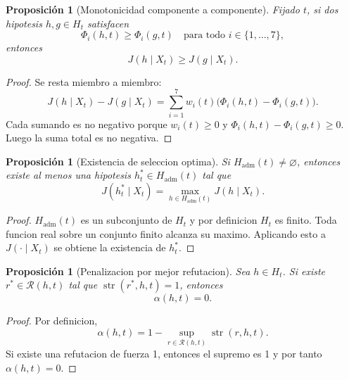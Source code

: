 \documentclass[12pt,a4paper]{article}
\newcommand{\str}{\operatorname{str}}
\theoremstyle{definition}
\theoremstyle{plain}
\newtheorem{proposition}[definition]{Proposici\'on}
\theoremstyle{remark}
\begin{document}
\begin{proposition}[Monotonicidad componente a componente]
Fijado $t$, si dos hipotesis $h,g\in H_t$ satisfacen
\begin{equation}
\Phi_i(h,t)\ge \Phi_i(g,t)\quad \text{para todo }i\in\{1,\dots,7\},
\end{equation}
entonces
\begin{equation}
J(h\mid X_t)\ge J(g\mid X_t).
\end{equation}
\end{proposition}

\begin{proof}
Se resta miembro a miembro:
\begin{equation}
J(h\mid X_t)-J(g\mid X_t)=\sum_{i=1}^7 w_i(t)\bigl(\Phi_i(h,t)-\Phi_i(g,t)\bigr).
\end{equation}
Cada sumando es no negativo porque $w_i(t)\ge 0$ y $\Phi_i(h,t)-\Phi_i(g,t)\ge 0$. Luego la suma total es no negativa.
\end{proof}

\begin{proposition}[Existencia de seleccion optima]
Si $H_{\mathrm{adm}}(t)\neq\varnothing$, entonces existe al menos una hipotesis $h^*_t\in H_{\mathrm{adm}}(t)$ tal que
\begin{equation}
J(h^*_t\mid X_t)=\max_{h\in H_{\mathrm{adm}}(t)}J(h\mid X_t).
\end{equation}
\end{proposition}

\begin{proof}
$H_{\mathrm{adm}}(t)$ es un subconjunto de $H_t$ y por definicion $H_t$ es finito. Toda funcion real sobre un conjunto finito alcanza su maximo. Aplicando esto a $J(\cdot\mid X_t)$ se obtiene la existencia de $h^*_t$.
\end{proof}

\begin{proposition}[Penalizacion por mejor refutacion]
Sea $h\in H_t$. Si existe $r^*\in\mathcal{R}(h,t)$ tal que $\str(r^*,h,t)=1$, entonces
\begin{equation}
\alpha(h,t)=0.
\end{equation}
\end{proposition}

\begin{proof}
Por definicion,
\begin{equation}
\alpha(h,t)=1-\sup_{r\in\mathcal{R}(h,t)}\str(r,h,t).
\end{equation}
Si existe una refutacion de fuerza 1, entonces el supremo es 1 y por tanto $\alpha(h,t)=0$.
\end{proof}
\end{document}
